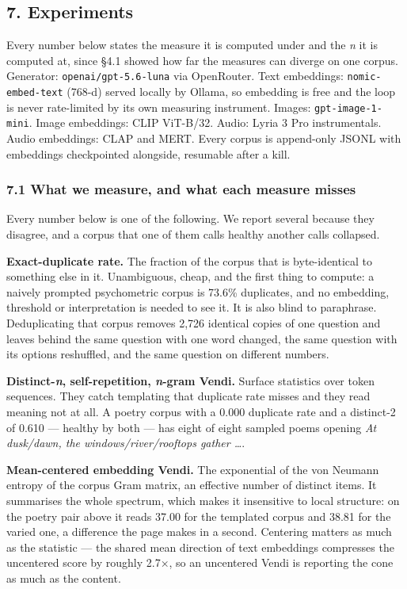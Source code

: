 \documentclass[
  10pt,
]{article}
\theoremstyle{plain}
\theoremstyle{definition}
\begin{document}
\subsection{7. Experiments}\label{7-experiments}

Every number below states the measure it is computed under and the
\emph{n} it is computed at, since §4.1 showed how far the measures can
diverge on one corpus. Generator: \texttt{openai/gpt-5.6-luna} via
OpenRouter. Text embeddings: \texttt{nomic-embed-text} (768-d) served
locally by Ollama, so embedding is free and the loop is never
rate-limited by its own measuring instrument. Images:
\texttt{gpt-image-1-mini}. Image embeddings: CLIP ViT-B/32. Audio: Lyria
3 Pro instrumentals. Audio embeddings: CLAP and MERT. Every corpus is
append-only JSONL with embeddings checkpointed alongside, resumable
after a kill.

\subsubsection{7.1 What we measure, and what each measure
misses}\label{71-what-we-measure-and-what-each-measure-misses}

Every number below is one of the following. We report several because
they disagree, and a corpus that one of them calls healthy another calls
collapsed.

\textbf{Exact-duplicate rate.} The fraction of the corpus that is
byte-identical to something else in it. Unambiguous, cheap, and the
first thing to compute: a naively prompted psychometric corpus is 73.6\%
duplicates, and no embedding, threshold or interpretation is needed to
see it. It is also blind to paraphrase. Deduplicating that corpus
removes 2,726 identical copies of one question and leaves behind the
same question with one word changed, the same question with its options
reshuffled, and the same question on different numbers.

\textbf{Distinct-\emph{n}, self-repetition, \emph{n}-gram Vendi.}
Surface statistics over token sequences. They catch templating that
duplicate rate misses and they read meaning not at all. A poetry corpus
with a 0.000 duplicate rate and a distinct-2 of 0.610 --- healthy by
both --- has eight of eight sampled poems opening \emph{At dusk/dawn,
the windows/river/rooftops gather \ldots{}}.

\textbf{Mean-centered embedding Vendi.} The exponential of the von
Neumann entropy of the corpus Gram matrix, an effective number of
distinct items. It summarises the whole spectrum, which makes it
insensitive to local structure: on the poetry pair above it reads 37.00
for the templated corpus and 38.81 for the varied one, a difference the
page makes in a second. Centering matters as much as the statistic ---
the shared mean direction of text embeddings compresses the uncentered
score by roughly 2.7×, so an uncentered Vendi is reporting the cone as
much as the content.
\end{document}
